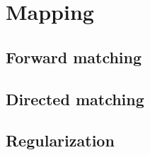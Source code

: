 
\section{Mapping}


\subsection{Forward matching}


\subsection{Directed matching}

%


\subsection{Regularization}


